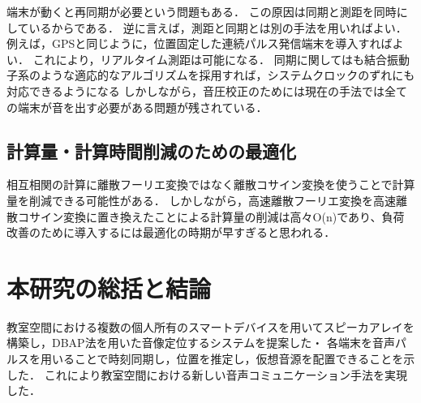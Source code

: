 端末が動くと再同期が必要という問題もある．
この原因は同期と測距を同時にしているからである．
逆に言えば，測距と同期とは別の手法を用いればよい．
例えば，GPSと同じように，位置固定した連続パルス発信端末を導入すればよい．
これにより，リアルタイム測距は可能になる．
同期に関してはも結合振動子系のような適応的なアルゴリズムを採用すれば，システムクロックのずれにも対応できるようになる
しかしながら，音圧校正のためには現在の手法では全ての端末が音を出す必要がある問題が残されている．


\subsection{計算量・計算時間削減のための最適化}
相互相関の計算に離散フーリエ変換ではなく離散コサイン変換を使うことで計算量を削減できる可能性がある．
しかしながら，高速離散フーリエ変換を高速離散コサイン変換に置き換えたことによる計算量の削減は高々O(n)であり、負荷改善のために導入するには最適化の時期が早すぎると思われる．


\section{本研究の総括と結論}

教室空間における複数の個人所有のスマートデバイスを用いてスピーカアレイを構築し，DBAP法を用いた音像定位するシステムを提案した・
各端末を音声パルスを用いることで時刻同期し，位置を推定し，仮想音源を配置できることを示した．
これにより教室空間における新しい音声コミュニケーション手法を実現した．
